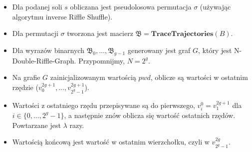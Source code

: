 \begin{itemize}
	\item Dla podanej soli $s$ obliczana jest pseudolosowa permutacja $\sigma$ (używając algorytmu inverse Riffle Shuffle).
	
	\item Dla permutacji $\sigma$ tworzona jest macierz $\mathfrak{B} = \mathbf{TraceTrajectories}(B)$.
	
	\item Dla wyrazów binarnych $\mathfrak{B}_{0},\dots,\mathfrak{B}_{g-1}$ generowany jest graf $G$, który jest N-Double-Riffle-Graph. Przypomnijmy, $N = 2 ^ {g}$.
	
	\item Na grafie $G$ zainicjalizowanym wartością $pwd$, oblicze są wartości w ostatnim rzędzie ($v_{0}^{2g+1},\dots,v_{2^{g} - 1}^{2g + 1}$).
	
	\item Wartości z ostatniego rzędu przepisywane są do pierwszego, $v_{i}^{0} = v_{1}^{2g+1}$ dla $i \in \{ 0,\dots,2^{g}-1 \}$, a następnie znów oblicza się wartość ostatnich rzędów. Powtarzane jest $\lambda$ razy.
	
	\item Wartością końcową jest wartość w ostatnim wierzchołku, czyli w $v_{2^{g} - 1}^{2g}$.
\end{itemize}

